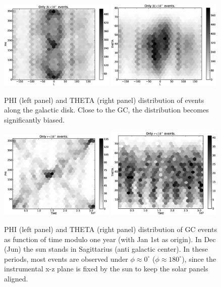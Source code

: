 \documentclass[aps,twocolumn,prd,superscriptaddress,showpacs,nofootinbib,fixfloat]{revtex4}
\begin{document}
\begin{figure}
\centering
\includegraphics[width=0.49\textwidth]{plots/L_PHI.eps}
\includegraphics[width=0.49\textwidth]{plots/L_THETA.eps}
\caption{PHI (left panel) and THETA (right panel) distribution of events along
the galactic disk. Close to the GC, the distribution becomes significantly
biased.}
\label{fig:l_phiandtheta}
\end{figure}

\begin{figure}
\centering
\includegraphics[width=0.49\textwidth]{plots/TIME_PHI.eps}
\includegraphics[width=0.49\textwidth]{plots/TIME_THETA.eps}
\caption{PHI (left panel) and THETA (right panel) distribution of GC events as
function of time modulo one year (with Jan 1st as origin). In Dec (Jun) the
sun stands in Sagittarius (anti galactic center). In these periods, most
events are observed under $\phi\approx 0^\circ$ ($\phi\approx 180^\circ$),
since the instrumental x-z plane is fixed by the sun to keep the solar panels
aligned.}
\label{fig:time_phi}
\end{figure}
\end{document}

